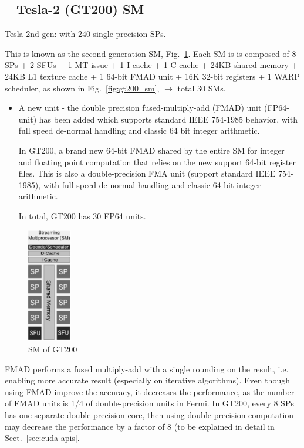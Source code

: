 \subsection{-- Tesla-2 (GT200) SM}
\label{sec:SM-Tesla-2}

Tesla 2nd gen: with 240 single-precision SPs.

This is known as the second-generation SM, Fig.~\ref{fig:SM}.
Each SM is is composed of 8 SPs + 2 SFUs + 1 MT issue + 1 I-cache
+ 1 C-cache + 24KB shared-memory + 24KB L1 texture cache + 1
64-bit FMAD unit + 16K 32-bit registers + 1 WARP scheduler, as
shown in Fig.~\ref{fig:gt200_sm}, $\rightarrow$ total 30 SMs.
    
\begin{itemize}
  \item A new unit - the double precision fused-multiply-add (FMAD)
    unit (FP64-unit) has been added which supports standard IEEE 754-1985
    behavior, with full speed de-normal handling and classic 64 bit integer
    arithmetic. 
    
In GT200, a brand new 64-bit FMAD shared by the entire SM for integer
and floating point computation that relies on the new support 64-bit
register files. This is also a double-precision FMA unit (support
standard IEEE 754-1985), with full speed de-normal handling and
classic 64-bit integer arithmetic. 

In total, GT200 has 30 FP64 units.
\end{itemize}

\begin{figure}[hbt]
  \centerline{\includegraphics[height=5cm,
    angle=0]{./images/SM_GT200.eps}}
 \caption{SM of GT200}
\label{fig:SM}
\end{figure}


\begin{framed}
  FMAD performs a fused multiply-add with a single rounding on the
  result, i.e. enabling more accurate result (especially on iterative
  algorithms).  Even though using FMAD improve the accuracy, it
  decreases the performance, as the number of FMAD units is 1/4 of
  double-precision units in Fermi.  In GT200, every 8 SPs has one
  separate double-precision core, then using double-precision
  computation may decrease the performance by a factor of 8 (to be
  explained in detail in Sect.~\ref{sec:cuda-apis}.
\end{framed}

